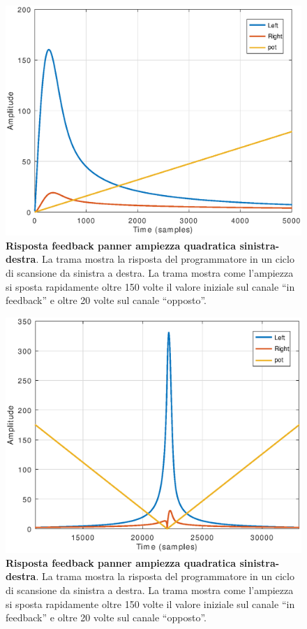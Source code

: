 \begin{figure}[t]
\centering
\includegraphics[width=1\columnwidth]{CAPITOLI/1000/IMG/lrpanfb_init}
\caption{\textbf{Risposta feedback panner ampiezza quadratica sinistra-destra}.
La trama mostra la risposta del programmatore in un ciclo di scansione da
sinistra a destra. La trama mostra come l'ampiezza si sposta rapidamente oltre
150 volte il valore iniziale sul canale “in feedback” e oltre 20 volte sul
canale “opposto”.}
\label{fig:lrpanfb1}
\end{figure}

\begin{figure}[t]
\centering
\includegraphics[width=1\columnwidth]{CAPITOLI/1000/IMG/lrpanfbpot2}
\caption{\textbf{Risposta feedback panner ampiezza quadratica sinistra-destra}.
La trama mostra la risposta del programmatore in un ciclo di scansione da
sinistra a destra. La trama mostra come l'ampiezza si sposta rapidamente oltre
150 volte il valore iniziale sul canale “in feedback” e oltre 20 volte sul
canale “opposto”.}
\label{fig:lrpanfb2}
\end{figure}

